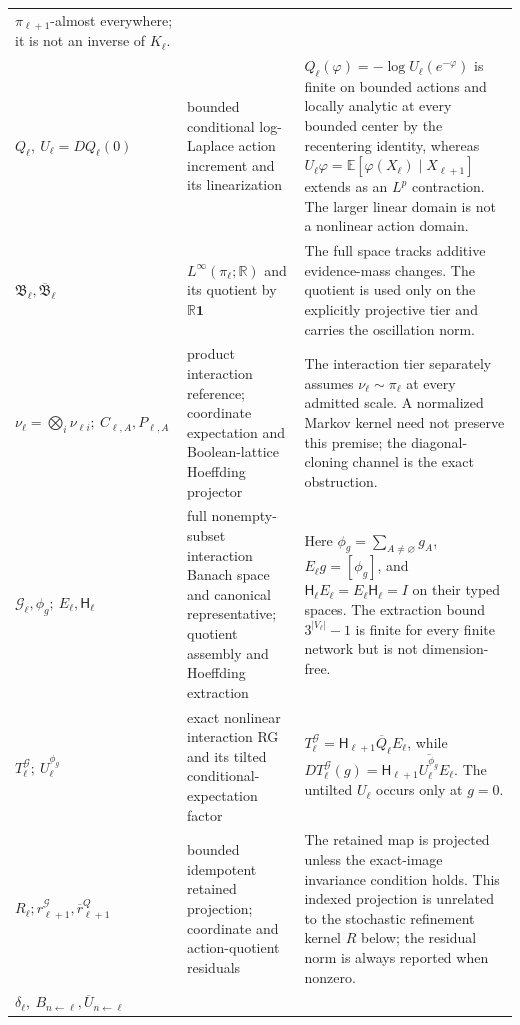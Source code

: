 \begin{longtable}{@{}>{\raggedright\arraybackslash}p{}
>{\raggedright\arraybackslash}p{}
>{\raggedright\arraybackslash}p{}@{}}
\(\pi_{\ell+1}\)-almost everywhere; it is not an inverse of
\(K_\ell\). \\
\(Q_\ell,\ U_\ell=DQ_\ell(0)\) &
bounded conditional log-Laplace action increment and its linearization &
\(Q_\ell(\varphi)=-\log U_\ell(e^{-\varphi})\) is finite on bounded
actions and locally analytic at every bounded center by the recentering
identity, whereas
\(U_\ell\varphi=\mathbb E[\varphi(X_\ell)\mid X_{\ell+1}]\) extends as an
\(L^p\) contraction.  The larger linear domain is not a nonlinear action
domain. \\
\(\mathfrak B_\ell,\overline{\mathfrak B}_\ell\) &
\(L^\infty(\pi_\ell;\mathbb R)\) and its quotient by
\(\mathbb R\mathbf1\) &
The full space tracks additive evidence-mass changes.  The quotient is used
only on the explicitly projective tier and carries the oscillation norm. \\
\(\nu_\ell=\bigotimes_i\nu_{\ell i};\ C_{\ell,A},P_{\ell,A}\) &
product interaction reference; coordinate expectation and Boolean-lattice
Hoeffding projector &
The interaction tier separately assumes \(\nu_\ell\sim\pi_\ell\) at every
admitted scale.  A normalized Markov kernel need not preserve this premise;
the diagonal-cloning channel is the exact obstruction. \\
\(\mathcal G_\ell,\phi_g;\ E_\ell,\mathsf H_\ell\) &
full nonempty-subset interaction Banach space and canonical representative;
quotient assembly and Hoeffding extraction &
Here \(\phi_g=\sum_{A\ne\varnothing}g_A\), \(E_\ell g=[\phi_g]\), and
\(\mathsf H_\ell E_\ell=E_\ell\mathsf H_\ell=I\) on their typed spaces.  The extraction
bound \(3^{|V_\ell|}-1\) is finite for every finite network but is not
dimension-free. \\
\(T_\ell^{\mathcal G};\ U_\ell^{\phi_g}\) &
exact nonlinear interaction RG and its tilted conditional-expectation factor &
\(T_\ell^{\mathcal G}=\mathsf H_{\ell+1}\overline Q_\ell E_\ell\), while
\(DT_\ell^{\mathcal G}(g)=\mathsf H_{\ell+1}\overline{U_\ell^{\phi_g}}E_\ell\).
The untilted \(U_\ell\) occurs only at \(g=0\). \\
\(R_\ell;r_{\ell+1}^{\mathcal G},\overline r_{\ell+1}^{Q}\) &
bounded idempotent retained projection; coordinate and action-quotient
residuals &
The retained map is projected unless the exact-image invariance condition
holds.  This indexed projection is unrelated to the stochastic refinement
kernel \(R\) below; the residual norm is always reported when nonzero. \\
\(\delta_\ell,\ B_{n\leftarrow\ell},\overline U_{n\leftarrow\ell}\) &

\end{longtable}
